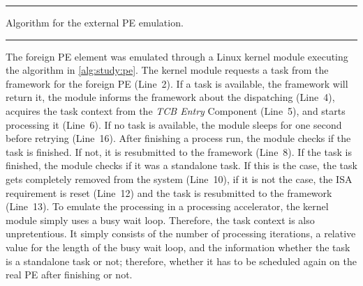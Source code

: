 \begin{listing}[t!]
	\begin{minipage}{.7\textwidth}
		\rule{\textwidth}{0.5pt}
		\caption{Algorithm for the external PE emulation.\label{alg:study:pe}}\vspace{-5mm}
		\begin{algorithmic}[1]
			\Statex
					\State {}
					\State {}
						\State {}
						\State {}
					\Else
						\State {}
						\State {}
					\EndIf
				\Else
					\State {}
				\EndIf
			\EndWhile
		\end{algorithmic}
		\vspace{-3mm}\rule{\textwidth}{0.5pt}
	\end{minipage}
\end{listing}

The foreign \ac{PE} element was emulated through a Linux kernel module executing the algorithm in \cref{alg:study:pe}. The kernel module requests a task from the \cobas{} framework for the foreign \ac{PE} (Line~2). If a task is available, the framework will return it, the module informs the framework about the dispatching (Line~4), acquires the task context from the \emph{TCB Entry} Component (Line~5), and starts processing it (Line~6). If no task is available, the module sleeps for one second before retrying (Line~16). After finishing a process run, the module checks if the task is finished. If not, it is resubmitted to the framework (Line~8). If the task is finished, the module checks if it was a standalone task. If this is the case, the task gets completely removed from the system (Line~10), if it is not the case, the \ac{ISA} requirement is reset (Line~12) and the task is resubmitted to the framework (Line~13). To emulate the processing in a processing accelerator, the kernel module simply uses a busy wait loop. Therefore, the task context is also unpretentious. It simply consists of the number of processing iterations, a relative value for the length of the busy wait loop, and the information whether the task is a standalone task or not; therefore, whether it has to be scheduled again on the real \ac{PE} after finishing or not.

